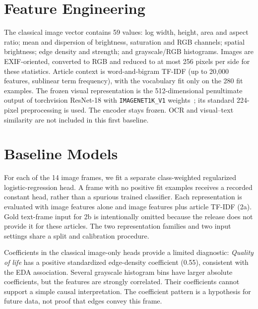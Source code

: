 \documentclass[11pt]{article}
\begin{document}
\section{Feature Engineering}\label{sec:features}
The classical image vector contains 59 values: log width, height, area and aspect ratio; mean and dispersion of brightness, saturation and RGB channels; spatial brightness; edge density and strength; and grayscale/RGB histograms. Images are EXIF-oriented, converted to RGB and reduced to at most 256 pixels per side for these statistics. Article context is word-and-bigram TF-IDF (up to 20,000 features, sublinear term frequency), with the vocabulary fit only on the 280 fit examples. The frozen visual representation is the 512-dimensional penultimate output of torchvision ResNet-18 with \texttt{IMAGENET1K\_V1} weights~\cite{he2016}; its standard 224-pixel preprocessing is used. The encoder stays frozen. OCR and visual--text similarity are not included in this first baseline.

\section{Baseline Models}\label{sec:models}
For each of the 14 image frames, we fit a separate class-weighted regularized logistic-regression head. A frame with no positive fit examples receives a recorded constant head, rather than a spurious trained classifier. Each representation is evaluated with image features alone and image features plus article TF-IDF (2a). Gold text-frame input for 2b is intentionally omitted because the release does not provide it for these articles. The two representation families and two input settings share a split and calibration procedure.

Coefficients in the classical image-only heads provide a limited diagnostic: \emph{Quality of life} has a positive standardized edge-density coefficient (0.55), consistent with the EDA association. Several grayscale histogram bins have larger absolute coefficients, but the features are strongly correlated. Their coefficients cannot support a simple causal interpretation. The coefficient pattern is a hypothesis for future data, not proof that edges convey this frame.
\end{document}
